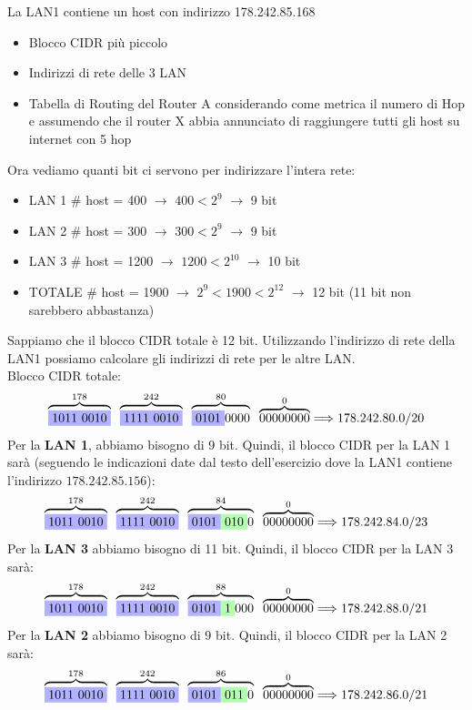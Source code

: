 \documentclass[a4paper]{article}
\begin{document}
La LAN1 contiene un host con indirizzo 178.242.85.168

\begin{itemize}
    \item Blocco CIDR più piccolo
    \item Indirizzi di rete delle 3 LAN
    \item Tabella di Routing del Router A considerando come metrica il numero di Hop
    e assumendo che il router X abbia annunciato di raggiungere tutti gli host su internet con 5 hop
\end{itemize}
Ora vediamo quanti bit ci servono per indirizzare l'intera rete:
\begin{itemize}
    \item LAN 1 \# host = 400 $\rightarrow$ $400 < 2^9$ $\rightarrow$ 9 bit
    \item LAN 2 \# host = 300 $\rightarrow$ $300< 2^9$ $\rightarrow$ 9 bit
    \item LAN 3 \# host = 1200 $\rightarrow$ $1200 < 2^{10}$ $\rightarrow$ 10 bit
    \item TOTALE \# host = 1900 $\rightarrow$ $2^9 < 1900 < 2^{12}$ $\rightarrow$ 12 bit (11 bit non sarebbero abbastanza)
\end{itemize}
Sappiamo che il blocco CIDR totale è 12 bit. Utilizzando l'indirizzo di rete della LAN1 possiamo calcolare gli indirizzi di rete per le altre LAN.
\\
Blocco CIDR totale:
\[\overbrace{\colorbox{blue!30!white}{1011 0010}}^{178} \; \; \overbrace{\colorbox{blue!30!white}{1111 0010}}^{242} \; \; \overbrace{\colorbox{blue!30!white}{0101}0000}^{80} \; \; \overbrace{00000000}^{0} \Longrightarrow 178.242.80.0/20\]
Per la \textbf{LAN 1}, abbiamo bisogno di 9 bit. Quindi, il blocco CIDR per la LAN 1 sarà (seguendo le indicazioni date dal testo dell'esercizio dove la LAN1 contiene l'indirizzo $178.242.85.156$):
\[\overbrace{\colorbox{blue!30!white}{1011 0010}}^{178} \; \; \overbrace{\colorbox{blue!30!white}{1111 0010}}^{242} \; \; \overbrace{\colorbox{blue!30!white}{0101}\colorbox{green!30!white}{010}0}^{84} \; \; \overbrace{00000000}^{0} \Longrightarrow 178.242.84.0/23\]
Per la \textbf{LAN 3} abbiamo bisogno di 11 bit. Quindi, il blocco CIDR per la LAN 3 sarà:
\[\overbrace{\colorbox{blue!30!white}{1011 0010}}^{178} \; \; \overbrace{\colorbox{blue!30!white}{1111 0010}}^{242} \; \; \overbrace{\colorbox{blue!30!white}{0101}\colorbox{green!30!white}{1}000}^{88} \; \; \overbrace{00000000}^{0} \Longrightarrow 178.242.88.0/21\]
Per la \textbf{LAN 2} abbiamo bisogno di 9 bit. Quindi, il blocco CIDR per la LAN 2 sarà:
\[\overbrace{\colorbox{blue!30!white}{1011 0010}}^{178} \; \; \overbrace{\colorbox{blue!30!white}{1111 0010}}^{242} \; \; \overbrace{\colorbox{blue!30!white}{0101}\colorbox{green!30!white}{011}0}^{86} \; \; \overbrace{00000000}^{0} \Longrightarrow 178.242.86.0/21\]
\end{document}
